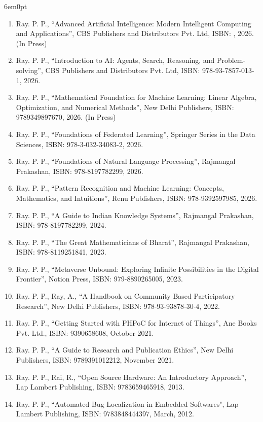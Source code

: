 \documentclass[11pt,a4paper]{moderncv}
\begin{document}
\begin{adjustwidth}{6em}{0pt}
	\begin{enumerate}
		
		\item Ray. P. P., “Advanced Artificial Intelligence: Modern Intelligent Computing and Applications”, CBS Publishers and Distributors Pvt. Ltd, ISBN: , 2026. (In Press)

		\item Ray. P. P., “Introduction to AI: Agents, Search, Reasoning, and Problem-solving”, CBS Publishers and Distributors Pvt. Ltd, ISBN: 978-93-7857-013-1, 2026. 

		\item Ray. P. P., “Mathematical Foundation for Machine Learning: Linear Algebra, Optimization, and Numerical Methods”, New Delhi Publishers, ISBN: 9789349897670, 2026. (In Press)
		
		\item Ray. P. P., “Foundations of Federated Learning”, Springer Series in the Data Sciences, ISBN: 978-3-032-34083-2, 2026.
		
		\item Ray. P. P., “Foundations of Natural Language Processing”, Rajmangal Prakashan, ISBN: 978-8197782299, 2026.
		
		\item Ray. P. P., “Pattern Recognition and Machine Learning: Concepts, Mathematics, and Intuitions”, Renu Publishers, ISBN: 978-9392597985, 2026.
		
		\item Ray. P. P., “A Guide to Indian Knowledge Systems”, Rajmangal Prakashan, ISBN: 978-8197782299, 2024.
		
		\item Ray. P. P., “The Great Mathematicians of Bharat”, Rajmangal Prakashan, ISBN: 978-8119251841, 2023.
		
		\item Ray. P. P., “Metaverse Unbound: Exploring Infinite Possibilities in the Digital Frontier”, Notion Press, ISBN: 979-8890265005, 2023.
		
		\item Ray. P. P., Ray, A., “A Handbook on Community Based Participatory Research”, New Delhi Publishers, ISBN: 978-93-93878-30-4, 2022.
		
		\item Ray. P. P., “Getting Started with PHPoC for Internet of Things”, Ane Books Pvt. Ltd., ISBN: 9390658608, October 2021.
		
		\item Ray. P. P., “A Guide to Research and Publication Ethics”, New Delhi Publishers, ISBN: 9789391012212, November 2021.
		
		\item Ray. P. P., Rai, R., “Open Source Hardware: An Introductory Approach”, Lap Lambert Publishing, ISBN: 9783659465918, 2013.
		
		\item Ray. P. P., “Automated Bug Localization in Embedded Softwares", Lap Lambert Publishing, ISBN: 9783848444397, March, 2012.
		
	\end{enumerate}
\end{adjustwidth}
\end{document}
